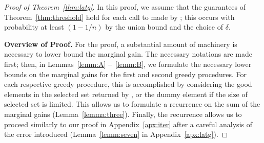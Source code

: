 \begin{proof}[Proof of Theorem~\ref{thm:latg}]
  In this proof, we
  assume that the guarantees 
  of Theorem~\ref{thm:threshold} hold
  for each call to \threseq made by
  \latg; this occurs with probability at least
  $(1 - 1/n)$ by the union bound and 
  the choice of $\delta$.
  
\textbf{Overview of Proof.}
For the proof, a substantial amount of
machinery is necessary to lower bound
the marginal gain. The necessary notations
are made first; then, in Lemmas~\ref{lemm:A} --~\ref{lemm:B},
we formulate the necessary lower bounds on the marginal gains
for the first and second greedy procedures. For each respective
greedy procedure, 
this is accomplished by considering the good elements in the selected set
returned by \threseq, or the dummy element if the size of 
selected set is limited. 
This allows us to formulate a recurrence
on the sum of the marginal gains (Lemma~\ref{lemma:three}).
Finally, the recurrence allows us to proceed similarly to our proof
in Appendix~\ref{apx:iter} after a careful analysis of the error
introduced (Lemma~\ref{lemm:seven} in Appendix~\ref{apx:latg}).


\end{proof}
